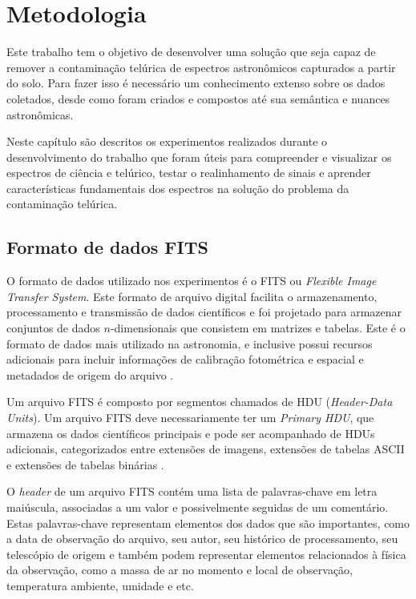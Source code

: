 \chapter{Metodologia}
\label{cap:desenvolvimentos}

Este trabalho tem o objetivo de desenvolver uma solução que seja capaz de remover a contaminação telúrica de espectros astronômicos capturados a partir do solo. Para fazer isso é necessário um conhecimento extenso sobre os dados coletados, desde como foram criados e compostos até sua semântica e nuances astronômicas.  

Neste capítulo são descritos os experimentos realizados durante o desenvolvimento do trabalho que foram úteis para compreender e visualizar os espectros de ciência e telúrico, testar o realinhamento de sinais e aprender características fundamentais dos espectros na solução do problema da contaminação telúrica.  

\section{Formato de dados FITS}

O formato de dados utilizado nos experimentos é o FITS ou \textit{Flexible Image Transfer System}. Este formato de arquivo digital facilita o armazenamento, processamento e transmissão de dados científicos e foi projetado para armazenar conjuntos de dados $n$-dimensionais que consistem em matrizes e tabelas. Este é o formato de dados mais utilizado na astronomia, e inclusive possui recursos adicionais para incluir informações de calibração fotométrica e espacial e metadados de origem do arquivo \citep{pence2010definition}.

Um arquivo FITS é composto por segmentos chamados de HDU (\textit{Header-Data Units}). Um arquivo FITS deve necessariamente ter um \textit{Primary HDU}, que armazena os dados científicos principais e pode ser acompanhado de HDUs adicionais, categorizados entre extensões de imagens, extensões de tabelas ASCII e extensões de tabelas binárias \citep{nasa-fits}.

O \textit{header} de um arquivo FITS contém uma lista de palavras-chave em letra maiúscula, associadas a um valor e possivelmente seguidas de um comentário. Estas palavras-chave representam elementos dos dados que são importantes, como a data de observação do arquivo, seu autor, seu histórico de processamento, seu telescópio de origem e também podem representar elementos relacionados à física da observação, como a massa de ar no momento e local de observação, temperatura ambiente, umidade e etc.

